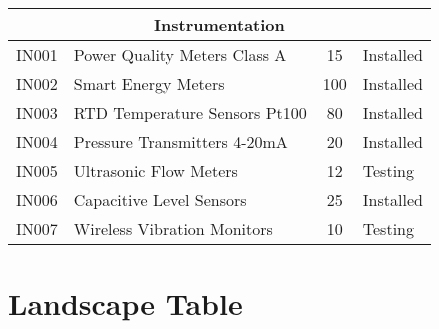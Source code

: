 \begin{longtable}{|c|l|c|l|}
	\multicolumn{4}{|c|}{\textbf{Instrumentation}} \\
	\hline
	IN001 & Power Quality Meters Class A & 15 & Installed \\
	IN002 & Smart Energy Meters & 100 & Installed \\
	IN003 & RTD Temperature Sensors Pt100 & 80 & Installed \\
	IN004 & Pressure Transmitters 4-20mA & 20 & Installed \\
	IN005 & Ultrasonic Flow Meters & 12 & Testing \\
	IN006 & Capacitive Level Sensors & 25 & Installed \\
	IN007 & Wireless Vibration Monitors & 10 & Testing \\
	\hline
\end{longtable}
\vspace{-1cm}
\section{Landscape Table}
\label{sec:landscape_table}

